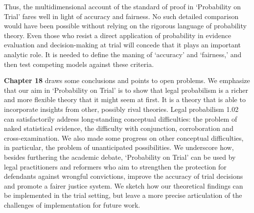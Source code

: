 \documentclass[
  10pt,
  dvipsnames,enabledeprecatedfontcommands]{scrartcl}
\begin{document}
Thus, the multidimensional account of the standard of proof in
`Probability on Trial' fares well in light of accuracy and fairness. No
such detailed comparison would have been possible without relying on the
rigorous language of probability theory. Even those who resist a direct
application of probability in evidence evaluation and decision-making at
trial will concede that it plays an important analytic role. It is
needed to define the maning of `accuracy' and `fairness,' and then test
competing models against these criteria.

\textbf{Chapter 18} draws some conclusions and points to open problems.
We emphasize that our aim in `Probability on Trial' is to show that
legal probabilism is a richer and more flexible theory that it might
seem at first. It is a theory that is able to incorporate insights from
other, possibly rival theories. Legal probabilism 1.02 can
satisfactorily address long-standing conceptual difficulties: the
problem of naked statistical evidence, the difficulty with conjunction,
corroboration and cross-examination. We also made some progress on other
conceptual difficulties, in particular, the problem of unanticipated
possibilities. We underscore how, besides furthering the academic
debate, `Probability on Trial' can be used by legal practitioners and
reformers who aim to strengthen the protection for defendants against
wrongful convictions, improve the accuracy of trial decisions and
promote a fairer justice system. We sketch how our theoretical findings
can be implemented in the trial setting, but leave a more precise
articulation of the challenges of implementation for future work.

\vspace{1mm}
\end{document}
